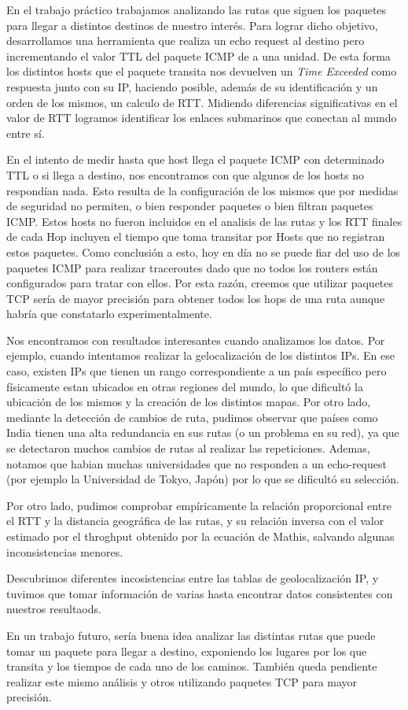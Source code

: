 En el trabajo práctico trabajamos analizando las rutas que siguen los paquetes para llegar a distintos destinos de nuestro interés. Para lograr dicho objetivo, desarrollamos una herramienta que realiza un echo request al destino pero incrementando el valor TTL del paquete ICMP de a una unidad. De esta forma los distintos hosts que el paquete transita nos devuelven un \textit{Time Exceeded} como respuesta junto con su IP, haciendo posible, además de su identificación y un orden de los mismos, un calculo de RTT. Midiendo diferencias significativas en el valor de RTT logramos identificar los enlaces submarinos que conectan al mundo entre sí.

En el intento de medir hasta que host llega el paquete ICMP con determinado TTL o si llega a destino, nos encontramos con que algunos de los hosts no respondían nada. Esto resulta de la configuración de los mismos que por medidas de seguridad no permiten, o bien responder paquetes o bien filtran paquetes ICMP. Estos hosts no fueron incluidos en el analisis de las rutas y los RTT finales de cada Hop incluyen el tiempo que toma transitar por Hosts que no registran estos paquetes. Como conclusión a esto, hoy en día no se puede fiar del uso de los paquetes ICMP para realizar traceroutes dado que no todos los routers están configurados para tratar con ellos. Por esta razón, creemos que utilizar paquetes TCP sería de mayor precisión para obtener todos los hops de una ruta aunque habría que constatarlo experimentalmente.

Nos encontramos con resultados interesantes cuando analizamos los datos. Por ejemplo, cuando intentamos realizar la gelocalización de los distintos IPs. En ese caso, existen IPs que tienen un rango correspondiente a un país específico pero físicamente estan ubicados en otras regiones del mundo, lo que dificultó la ubicación de los mismos y la creación de los distintos mapas. Por otro lado, mediante la detección de cambios de ruta, pudimos observar que países como India tienen una alta redundancia en sus rutas (o un problema en su red), ya que se detectaron muchos cambios de rutas al realizar las repeticiones. Ademas, notamos que habian muchas universidades que no responden a un echo-request (por ejemplo la Universidad de Tokyo, Japón) por lo que se dificultó su selección.

Por otro lado, pudimos comprobar empíricamente la relación proporcional entre el RTT y la distancia geográfica de las rutas, y su relación inversa con el valor estimado por el throghput obtenido por la ecuación de Mathis, salvando algunas inconsistencias menores.

Descubrimos diferentes incosistencias entre las tablas de geolocalización IP, y tuvimos que tomar información de varias hasta encontrar datos consistentes con nuestros resultaods.

En un trabajo futuro, sería buena idea analizar las distintas rutas que puede tomar un paquete para llegar a destino, exponiendo los lugares por los que transita y los tiempos de cada uno de los caminos. También queda pendiente realizar este mismo análisis y otros utilizando paquetes TCP para mayor precisión.